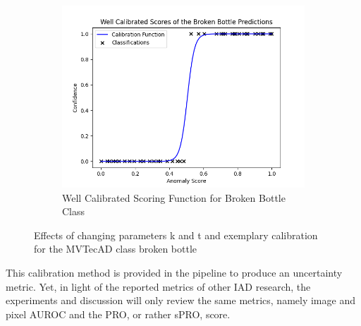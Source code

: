 \begin{figure}[htbp]
\begin{subfigure}[b]{0.3\textwidth}
        \includegraphics[width=\textwidth]{figures/anomaly_calibration_soft.png}
        \caption{Well Calibrated Scoring Function for Broken Bottle Class}
        \label{fig:sub3}
    \end{subfigure}
    \caption{Effects of changing parameters k and t and exemplary calibration for the MVTecAD \cite{MVTEC_Bergmann_2021} class broken bottle}
    \label{fig:calicalibraction}
\end{figure}

This calibration method is provided in the pipeline to produce an uncertainty metric. Yet, in light of the reported metrics of other IAD research, the experiments and discussion will only 
review the same metrics, namely image and pixel AUROC and the PRO, or rather sPRO, score.








